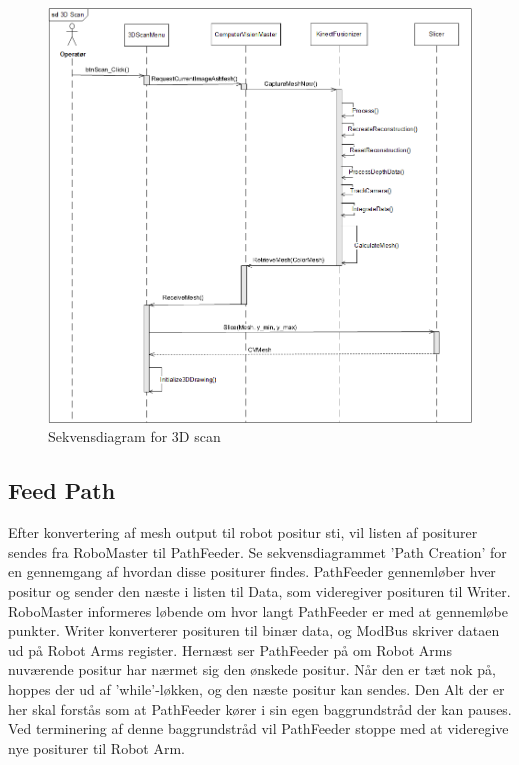 \begin{figure}[H]
    \centering
    \includegraphics[width=1\textwidth]{figurer/d/Design/Sequence/sd_3Dscan}
    \caption{Sekvensdiagram for 3D scan}
    \label{sd_3Dscan}
\end{figure}

\subsection{Feed Path}
Efter konvertering af mesh output til robot positur sti, vil listen af positurer sendes fra RoboMaster til PathFeeder. 
Se sekvensdiagrammet 'Path Creation' for en gennemgang af hvordan disse positurer findes.
PathFeeder gennemløber hver positur og sender den næste i listen til Data, som videregiver posituren til Writer.
RoboMaster informeres løbende om hvor langt PathFeeder er med at gennemløbe punkter.
Writer konverterer posituren til binær data, og ModBus skriver dataen ud på Robot Arms register.
Hernæst ser PathFeeder på om Robot Arms nuværende positur har nærmet sig den ønskede positur. 
Når den er tæt nok på, hoppes der ud af 'while'-løkken, og den næste positur kan sendes.
Den Alt der er her skal forstås som at PathFeeder kører i sin egen baggrundstråd der kan pauses. 
Ved terminering af denne baggrundstråd vil PathFeeder stoppe med at videregive nye positurer til Robot Arm.

